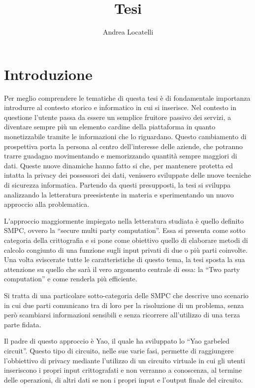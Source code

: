 \documentclass[
]{book}
\title{Tesi}
\author{Andrea Locatelli}
\date{}
\begin{document}
\maketitle

{
\setcounter{tocdepth}{1}
\tableofcontents
}
\hypertarget{introduzione}{%
\chapter{Introduzione}\label{introduzione}}

Per meglio comprendere le tematiche di questa tesi è di fondamentale importanza introdurre al contesto storico e informatico in cui si inserisce. Nel contesto in questione l'utente passa da essere un semplice fruitore passivo dei servizi, a diventare sempre più un elemento cardine della piattaforma in quanto monetizzabile tramite le informazioni che lo riguardano. Questo cambiamento di prospettiva porta la persona al centro dell'interesse delle aziende, che potranno trarre guadagno movimentando e memorizzando quantità sempre maggiori di dati. Queste nuove dinamiche hanno fatto si che, per mantenere protetta ed intatta la privacy dei possessori dei dati, venissero sviluppate delle nuove tecniche di sicurezza informatica. Partendo da questi presupposti, la tesi si sviluppa analizzando la letteratura preesistente in materia e sperimentando un nuovo approccio alla problematica.

L'approccio maggiormente impiegato nella letteratura studiata è quello definito SMPC, ovvero la ``secure multi party computation''. Essa si presenta come sotto categoria della crittografia e si pone come obiettivo quello di elaborare metodi di calcolo congiunto di una funzione sugli input privati di due o più parti coinvolte. Una volta sviscerate tutte le caratteristiche di questo tema, la tesi sposta la sua attenzione su quello che sarà il vero argomento centrale di essa: la ``Two party computation'' e come renderla più efficiente.

Si tratta di una particolare sotto-categoria delle SMPC che descrive uno scenario in cui due parti comunicano tra di loro per la risoluzione di un problema, senza però scambiarsi informazioni sensibili e senza ricorrere all'utilizzo di una terza parte fidata.

Il padre di questo approccio è Yao, il quale ha sviluppato lo ``Yao garbeled circuit''. Questo tipo di circuito, nelle sue varie fasi, permette di raggiungere l'obbiettivo di privacy mediante l'utilizzo di un circuito virtuale in cui gli utenti inseriscono i propri input crittografati e non verranno a conoscenza, al termine delle operazioni, di altri dati se non i propri input e l'output finale del circuito.
\end{document}
